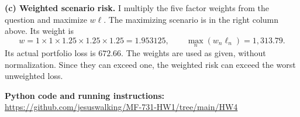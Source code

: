 \documentclass[10pt,letterpaper]{article}
\begin{document}
\textbf{(c) Weighted scenario risk.} I multiply the five factor weights from
the question and maximize $w\ell$. The maximizing scenario is in the right
column above. Its weight is
\[
w=1\times1\times1.25\times1.25\times1.25=1.953125,
\qquad \max_n(w_n\ell_n)=\boxed{1{,}313.79}.
\]
Its actual portfolio loss is $\boxed{672.66}$.
The weights are used as given, without normalization. Since they can exceed
one, the weighted risk can exceed the worst unweighted loss.

\vfill
\textbf{Python code and running instructions:}\\
\url{https://github.com/jesuswalking/MF-731-HW1/tree/main/HW4}
\end{document}
